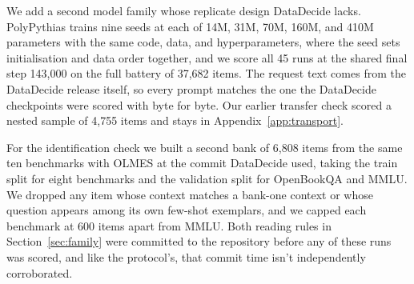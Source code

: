 

We add a second model family whose replicate design DataDecide lacks. PolyPythias \citep{vanderwal2025} trains nine seeds at each of 14M, 31M, 70M, 160M, and 410M parameters with the same code, data, and hyperparameters, where the seed sets initialisation and data order together, and we score all 45 runs at the shared final step 143,000 on the full battery of 37,682 items. The request text comes from the DataDecide release itself, so every prompt matches the one the DataDecide checkpoints were scored with byte for byte. Our earlier transfer check scored a nested sample of 4,755 items and stays in Appendix~\ref{app:transport}.

For the identification check we built a second bank of 6,808 items from the same ten benchmarks with OLMES at the commit DataDecide used, taking the train split for eight benchmarks and the validation split for OpenBookQA and MMLU. We dropped any item whose context matches a bank-one context or whose question appears among its own few-shot exemplars, and we capped each benchmark at 600 items apart from MMLU. Both reading rules in Section~\ref{sec:family} were committed to the repository before any of these runs was scored, and like the protocol's, that commit time isn't independently corroborated.


